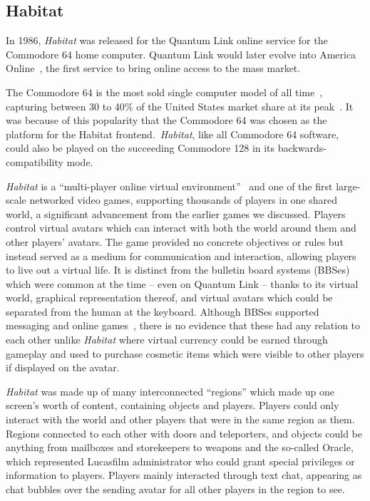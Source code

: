 \subsection{Habitat}\label{subsec:habitat}

In 1986, \textit{Habitat} was released for the Quantum Link online service for the Commodore 64 home computer. Quantum Link would later evolve into America Online~\cite{nollinger}, the first service to bring online access to the mass market.

The Commodore 64 is the most sold single computer model of all time~\cite{guinnessc64}, capturing between 30 to 40$\%$ of the United States market share at its peak~\cite{marketshare}. It was because of this popularity that the Commodore 64 was chosen as the platform for the Habitat frontend.\ \textit{Habitat}, like all Commodore 64 software, could also be played on the succeeding Commodore 128 in its backwards- compatibility mode.

\textit{Habitat} is a ``multi-player online virtual environment''~\cite{morningstar} and one of the first large-scale networked video games, supporting thousands of players in one shared world, a significant advancement from the earlier games we discussed. Players control virtual avatars which can interact with both the world around them and other players' avatars. The game provided no concrete objectives or rules but instead served as a medium for communication and interaction, allowing players to live out a virtual life. It is distinct from the bulletin board systems (BBSes) which were common at the time -- even on Quantum Link -- thanks to its virtual world, graphical representation thereof, and virtual avatars which could be separated from the human at the keyboard. Although BBSes supported messaging and online games~\cite{pcmagbbs}, there is no evidence that these had any relation to each other unlike \textit{Habitat} where virtual currency could be earned through gameplay and used to purchase cosmetic items which were visible to other players if displayed on the avatar.

\textit{Habitat} was made up of many interconnected ``regions'' which made up one screen's worth of content, containing objects and players. Players could only interact with the world and other players that were in the same region as them. Regions connected to each other with doors and teleporters, and objects could be anything from mailboxes and storekeepers to weapons and the so-called Oracle, which represented Lucasfilm administrator who could grant special privileges or information to players. Players mainly interacted through text chat, appearing as chat bubbles over the sending avatar for all other players in the region to see.

